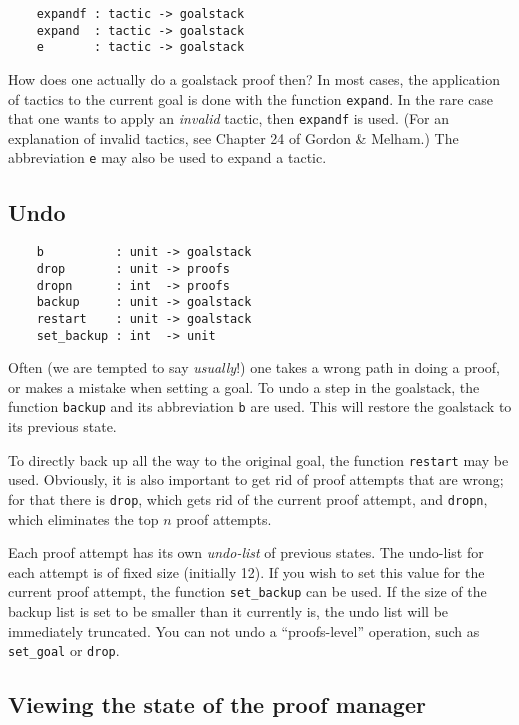 \documentclass[12pt,fleqn,a4paper]{report}
\begin{document}
\begin{verbatim}
    expandf : tactic -> goalstack
    expand  : tactic -> goalstack
    e       : tactic -> goalstack
\end{verbatim}

How does one actually do a goalstack proof then? In most cases, the
application of tactics to the current goal is done with the function
\verb+expand+. In the rare case that one wants to apply an
{\it invalid\/} tactic, then \verb+expandf+ is used. (For an
explanation of invalid tactics, see Chapter 24 of Gordon \& Melham.) The
abbreviation \verb+e+ may also be used to expand a tactic.


\subsection{Undo}

\begin{verbatim}
    b          : unit -> goalstack
    drop       : unit -> proofs
    dropn      : int  -> proofs
    backup     : unit -> goalstack
    restart    : unit -> goalstack
    set_backup : int  -> unit
\end{verbatim}

Often (we are tempted to say {\it usually}!) one takes a wrong path
in doing a proof, or makes a mistake when setting a goal. To undo a step
in the goalstack, the function \verb+backup+ and its abbreviation
\verb+b+ are used. This will restore the goalstack to its previous
state.


To directly back up all the way to the original goal, the function
\verb+restart+ may be used. Obviously, it is also important to get
rid of proof attempts that are wrong; for that there is \verb+drop+,
which gets rid of the current proof attempt, and \verb+dropn+, which
eliminates the top $n$ proof attempts.


Each proof attempt has its own {\it undo-list\/} of previous
states. The undo-list for each attempt is of fixed size (initially
12). If you wish to set this value for the current proof attempt, the
function \verb+set_backup+ can be used. If the size of the backup
list is set to be smaller than it currently is, the undo list will be
immediately truncated. You can not undo a ``proofs-level'' operation, such
as \verb+set_goal+ or \verb+drop+.

\subsection{Viewing the state of the proof manager}
\end{document}
